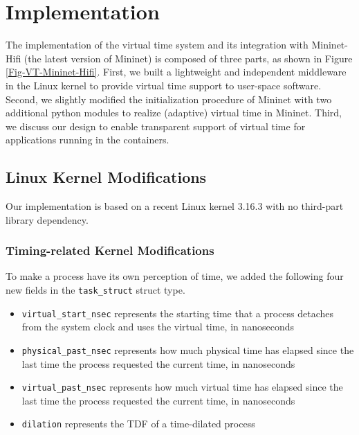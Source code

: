 \section{Implementation}
\label{Sec-Implementation}

The implementation of the virtual time system and its integration with Mininet-Hifi (the latest version of Mininet) is composed of three parts, as shown in Figure \ref{Fig-VT-Mininet-Hifi}. First, we built a lightweight and independent middleware in the Linux kernel to provide virtual time support to user-space software. Second, we slightly modified the initialization procedure of Mininet with two additional python modules to realize (adaptive) virtual time in Mininet. Third, we discuss our design to enable transparent support of virtual time for applications running in the containers.

\begin{figure*}
\centering
{}
\caption{\textbf{Integration of Mininet-Hifi and Virtual Time}}
\label{Fig-VT-Mininet-Hifi}
\end{figure*}

\subsection{Linux Kernel Modifications}
\label{Sub-Sec-ExtendLinuxKernel}

Our implementation is based on a recent Linux kernel 3.16.3 with no third-part library dependency.

\subsubsection{Timing-related Kernel Modifications}
To make a process have its own perception of time, we added the following four new fields in the \texttt{task\_struct} struct type.
\begin{itemize}
	\item \texttt{virtual\_start\_nsec} represents the starting time that a process detaches from the system clock and uses the virtual time, in nanoseconds 
	\item \texttt{physical\_past\_nsec} represents how much physical time has elapsed since the last time the process requested the current time, in nanoseconds 
	\item \texttt{virtual\_past\_nsec} represents how much virtual time has elapsed since the last time the process requested the current time, in nanoseconds
	\item \texttt{dilation} represents the TDF of a time-dilated process
\end{itemize}

